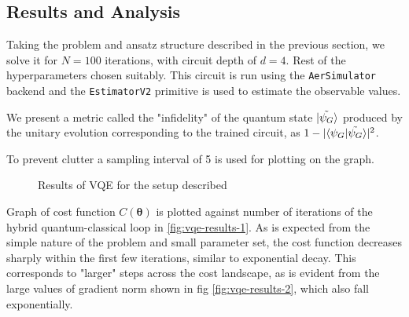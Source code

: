 \documentclass[11pt,a4paper]{article}
\begin{document}
\subsection{Results and Analysis}

Taking the problem and ansatz structure described in the previous section, we solve it for $N = 100$ iterations, with circuit depth of $d=4$. Rest of the hyperparameters chosen suitably. This circuit is run using the \texttt{AerSimulator} backend and the \texttt{EstimatorV2} primitive is used to estimate the observable values.

We present a metric called the "infidelity" of the quantum state $\ket{\Tilde{\psi_{G}}}$ produced by the unitary evolution corresponding to the trained circuit, as $1 - | \langle\psi_G|\Tilde{\psi_{G}}\rangle|^2$.

To prevent clutter a sampling interval of 5 is used for plotting on the graph.

\begin{figure}[H]
    \centering
    \caption{Results of VQE for the setup described}
    \label{fig:vqe-results}
\end{figure}

Graph of cost function $C(\boldsymbol{\theta})$ is plotted against number of iterations of the hybrid quantum-classical loop in \ref{fig:vqe-results-1}. As is expected from the simple nature of the problem and small parameter set, the cost function decreases sharply within the first few iterations, similar to exponential decay. This corresponds to "larger" steps across the cost landscape, as is evident from the large values of gradient norm shown in fig \ref{fig:vqe-results-2}, which also fall exponentially. 
\end{document}
